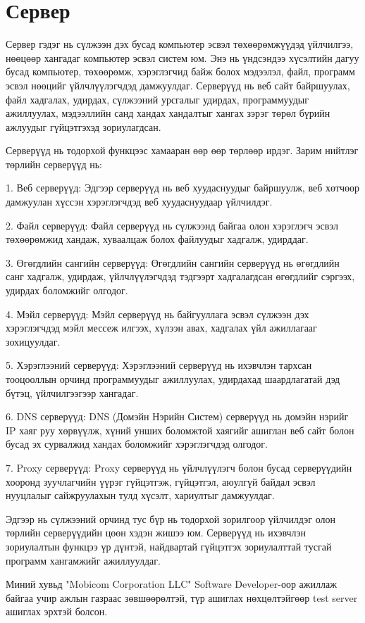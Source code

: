 \section{Сервер}
Сервер гэдэг нь сүлжээн дэх бусад компьютер эсвэл төхөөрөмжүүдэд үйлчилгээ, нөөцөөр хангадаг компьютер эсвэл систем юм. Энэ нь үндсэндээ хүсэлтийн дагуу бусад компьютер, төхөөрөмж, хэрэглэгчид байж болох мэдээлэл, файл, программ эсвэл нөөцийг үйлчлүүлэгчдэд дамжуулдаг. Серверүүд нь веб сайт байршуулах, файл хадгалах, удирдах, сүлжээний урсгалыг удирдах, программуудыг ажиллуулах, мэдээллийн санд хандах хандалтыг хангах зэрэг төрөл бүрийн ажлуудыг гүйцэтгэхэд зориулагдсан.

Серверүүд нь тодорхой функцээс хамааран өөр өөр төрлөөр ирдэг. Зарим нийтлэг төрлийн серверүүд нь:

1. Веб серверүүд: Эдгээр серверүүд нь веб хуудаснуудыг байршуулж, веб хөтчөөр дамжуулан хүссэн хэрэглэгчдэд веб хуудаснуудаар үйлчилдэг.

2. Файл серверүүд: Файл серверүүд нь сүлжээнд байгаа олон хэрэглэгч эсвэл төхөөрөмжид хандаж, хуваалцаж болох файлуудыг хадгалж, удирддаг.

3. Өгөгдлийн сангийн серверүүд: Өгөгдлийн сангийн серверүүд нь өгөгдлийн санг хадгалж, удирдаж, үйлчлүүлэгчдэд тэдгээрт хадгалагдсан өгөгдлийг сэргээх, удирдах боломжийг олгодог.

4. Мэйл серверүүд: Мэйл серверүүд нь байгууллага эсвэл сүлжээн дэх хэрэглэгчдэд мэйл мессеж илгээх, хүлээн авах, хадгалах үйл ажиллагааг зохицуулдаг.

5. Хэрэглээний серверүүд: Хэрэглээний серверүүд нь ихэвчлэн тархсан тооцооллын орчинд программуудыг ажиллуулах, удирдахад шаардлагатай дэд бүтэц, үйлчилгээгээр хангадаг.

6. DNS серверүүд: DNS (Домэйн Нэрийн Систем) серверүүд нь домэйн нэрийг IP хаяг руу хөрвүүлж, хүний унших боломжтой хаягийг ашиглан веб сайт болон бусад эх сурвалжид хандах боломжийг хэрэглэгчдэд олгодог.

7. Proxy серверүүд: Proxy серверүүд нь үйлчлүүлэгч болон бусад серверүүдийн хооронд зуучлагчийн үүрэг гүйцэтгэж, гүйцэтгэл, аюулгүй байдал эсвэл нууцлалыг сайжруулахын тулд хүсэлт, хариултыг дамжуулдаг.

Эдгээр нь сүлжээний орчинд тус бүр нь тодорхой зорилгоор үйлчилдэг олон төрлийн серверүүдийн цөөн хэдэн жишээ юм. Серверүүд нь ихэвчлэн зориулалтын функцээ үр дүнтэй, найдвартай гүйцэтгэх зориулалттай тусгай программ хангамжийг ажиллуулдаг.

Миний хувьд "Mobicom Corporation LLC" Software Developer-оор ажиллаж байгаа учир ажлын газраас зөвшөөрөлтэй, түр ашиглах нөхцөлтэйгөөр test server ашиглах эрхтэй болсон.

